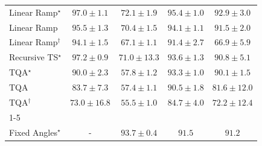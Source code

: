 \begin{tabular}{l|cccc|}
Linear Ramp$^\star$ & {\cellcolor[HTML]{712806}} \color[HTML]{F1F1F1} $97.0\pm 1.1$ & {\cellcolor[HTML]{FEB23F}} \color[HTML]{000000} $72.1\pm 1.9$ & {\cellcolor[HTML]{802D05}} \color[HTML]{F1F1F1} $95.4\pm 1.0$ & {\cellcolor[HTML]{963304}} \color[HTML]{F1F1F1} $92.9\pm 3.0$ \\
Linear Ramp & {\cellcolor[HTML]{802D05}} \color[HTML]{F1F1F1} $95.5\pm 1.3$ & {\cellcolor[HTML]{FEBE4A}} \color[HTML]{000000} $70.4\pm 1.5$ & {\cellcolor[HTML]{8B3005}} \color[HTML]{F1F1F1} $94.1\pm 1.1$ & {\cellcolor[HTML]{A33904}} \color[HTML]{F1F1F1} $91.5\pm 2.0$ \\
Linear Ramp$^\dagger$ & {\cellcolor[HTML]{8B3005}} \color[HTML]{F1F1F1} $94.1\pm 1.5$ & {\cellcolor[HTML]{FED26D}} \color[HTML]{000000} $67.1\pm 1.1$ & {\cellcolor[HTML]{A33904}} \color[HTML]{F1F1F1} $91.4\pm 2.7$ & {\cellcolor[HTML]{FED36F}} \color[HTML]{000000} $66.9\pm 5.9$ \\
Recursive TS$^\star$ & {\cellcolor[HTML]{702806}} \color[HTML]{F1F1F1} $97.2\pm 0.9$ & {\cellcolor[HTML]{FEBA46}} \color[HTML]{000000} $71.0\pm 13.3$ & {\cellcolor[HTML]{903104}} \color[HTML]{F1F1F1} $93.6\pm 1.3$ & {\cellcolor[HTML]{A93C03}} \color[HTML]{F1F1F1} $90.8\pm 5.1$ \\
TQA$^\star$ & {\cellcolor[HTML]{B03F03}} \color[HTML]{F1F1F1} $90.0\pm 2.3$ & {\cellcolor[HTML]{FFF7BE}} \color[HTML]{000000} $57.8\pm 1.2$ & {\cellcolor[HTML]{933204}} \color[HTML]{F1F1F1} $93.3\pm 1.0$ & {\cellcolor[HTML]{B03F03}} \color[HTML]{F1F1F1} $90.1\pm 1.5$ \\
TQA & {\cellcolor[HTML]{DD5F0C}} \color[HTML]{F1F1F1} $83.7\pm 7.3$ & {\cellcolor[HTML]{FFF8C2}} \color[HTML]{000000} $57.4\pm 1.1$ & {\cellcolor[HTML]{AB3C03}} \color[HTML]{F1F1F1} $90.5\pm 1.8$ & {\cellcolor[HTML]{E96D13}} \color[HTML]{F1F1F1} $81.6\pm 12.0$ \\
TQA$^\dagger$ & {\cellcolor[HTML]{FEAB39}} \color[HTML]{000000} $73.0\pm 16.8$ & {\cellcolor[HTML]{FFFBCF}} \color[HTML]{000000} $55.5\pm 1.0$ & {\cellcolor[HTML]{D85A09}} \color[HTML]{F1F1F1} $84.7\pm 4.0$ & {\cellcolor[HTML]{FEB13E}} \color[HTML]{000000} $72.2\pm 12.4$ \\
\cline{1-5}
\multicolumn{5}{c}{\rule{0pt}{8pt}PP} \\
\midrule
Fixed Angles$^\star$ & {\cellcolor[HTML]{000000}} \color[HTML]{F1F1F1} {\cellcolor{white}} \color{black} - & {\cellcolor[HTML]{006234}} \color[HTML]{F1F1F1} $93.7\pm 0.4$ & {\cellcolor[HTML]{076D39}} \color[HTML]{F1F1F1} $91.5$ & {\cellcolor[HTML]{096F3A}} \color[HTML]{F1F1F1} $91.2$ \\

\end{tabular}

